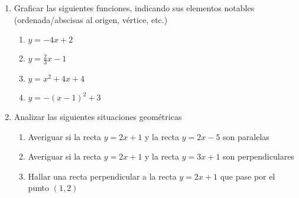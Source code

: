 \documentclass[a4paper]{article}
\newcommand{\exercise}{\item}
\begin{document}
\begin{enumerate}
	\begin{multicols}{2}
	\begin{enumerate} [label=(\alph*)]
		\item $3x+5$ con $x \in \mathbb{N}$
		\item $4x^2$ con $x \in \mathbb{N}$
		\item $\displaystyle\frac{x^2}{3}+1$ con $x \in \mathbb{N}$
		\item $-6x+1$ con $x \in \mathbb{N}$
		\item $x^2+x+1$ con $x \in \mathbb{Z}$
		\item $x+\displaystyle\frac{1}{2}$ con $x \in \mathbb{Z}$
		\item $\displaystyle\frac{1}{x-1}$ con $x \in \mathbb{Z}$ y $x \neq 1$
		\item $3 \sqrt{x}$ con $x \in \mathbb{N}$
		\item $\displaystyle\frac{x^2}{x-4}$ con $x \in \mathbb{Z}$ y $x \neq 4$
		\item $\displaystyle\frac{\sqrt{3}x-3}{2}$ con $x \in \mathbb{Z}$
		\item $x+3$ con $x \in \mathbb{Q}$
		\item $\displaystyle\frac{1}{x}$ con $x \in \mathbb{Q}$ y $x \neq 0$
		\item $\sqrt{x}$ con $x \in \mathbb{Q}$
	\end{enumerate}
	\end{multicols}
	\exercise Graficar las siguientes funciones, indicando sus elementos notables (ordenada/abscisas al origen, vértice, etc.)
	\begin{enumerate} [label=(\alph*)]
		\item $y=-4x+2$
		\item $y=\displaystyle\frac{2}{3}x-1$
		\item $y=x^2+4x+4$
		\item $y=-(x-1)^2+3$
	\end{enumerate}
	\exercise Analizar las siguientes situaciones geométricas
	\begin{enumerate} [label=(\alph*)]
		\item Averiguar si la recta $y=2x+1$ y la recta $y=2x-5$ son paralelas
		\item Averiguar si la recta $y=2x+1$ y la recta $y=3x+1$ son perpendiculares
		\item Hallar una recta perpendicular a la recta $y=2x+1$ que pase por el punto $(1,2)$

\end{enumerate}
\end{enumerate}
\end{document}
